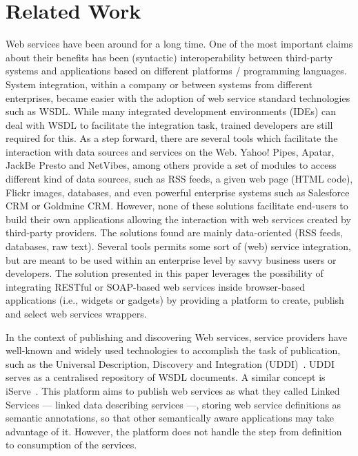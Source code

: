 
\section{Related Work}
\label{sec:related_work}

Web services have been around for a long time.
One of the most important claims about their benefits has been (syntactic) interoperability between third-party systems and applications based on different platforms / programming languages. 
System integration, within a company or between systems from different enterprises, became easier with the adoption of web service standard technologies such as WSDL. 
While many integrated development environments (IDEs) can deal with WSDL to facilitate the integration task, trained developers are still required for this.
As a step forward, there are several tools which facilitate the interaction with data sources and services on the Web. Yahoo! Pipes, Apatar, JackBe Presto and NetVibes, among others provide a set of modules to access different kind of data sources, such as RSS feeds, a given web page (HTML code), Flickr images, databases, and even powerful enterprise systems such as Salesforce CRM or Goldmine CRM. 
However, none of these solutions facilitate end-users to build their own applications allowing the interaction with web services created by third-party providers. The solutions found are mainly data-oriented (RSS feeds, databases, raw text). Several tools permits some sort of (web) service integration, but are meant to be used within an enterprise level by savvy business users or developers. The solution presented in this paper leverages the possibility of integrating RESTful or SOAP-based web services inside browser-based applications (i.e., widgets or gadgets) by providing a platform to create, publish and select web services wrappers.

In the context of publishing and discovering Web services, service providers have well-known and widely used technologies to accomplish the task of publication, such as the Universal Description, Discovery and Integration (UDDI)~\cite{uddi2004}. UDDI serves as a centralised repository of WSDL documents. A similar concept is iServe~\cite{pedrinaci_ores2010}. This platform aims to publish web services as what they called Linked Services --- linked data describing services ---, storing web service definitions as semantic annotations, so that other semantically aware applications may take advantage of it. However, the platform does not handle the step from definition to consumption of the services.

